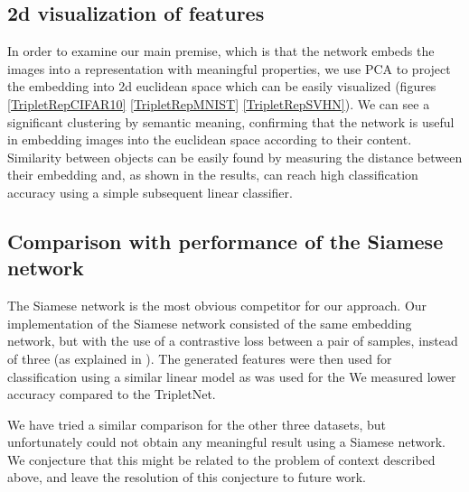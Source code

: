 \documentclass{article} %
\newcommand{\nir}[1]{{\color{red}{#1}}}
\begin{document}
\subsection{2d visualization of features}
In order to examine our main premise, which is that the network embeds the images into a representation with meaningful properties, we
use PCA to project the embedding into 2d euclidean space which can be easily visualized (figures \ref{TripletRepCIFAR10} \ref{TripletRepMNIST} \ref{TripletRepSVHN}).
We can see a significant clustering by semantic meaning, confirming that the network is useful in embedding
images into the euclidean space according to their content. 
 Similarity between objects can be easily found by  measuring the distance between their embedding and, as shown in the results, can reach high
classification accuracy using a simple subsequent linear classifier. 

\subsection{Comparison with performance of the Siamese network}
The Siamese network is the most obvious competitor for our approach.  Our implementation of the Siamese network consisted of the same embedding network, but with the use of a contrastive loss between a pair of samples, instead of three (as explained in  \cite{Chopra2005}).  The generated features were then used for classification using a similar linear model as was used for the We measured lower accuracy compared to the TripletNet. \nir{Fix the last sentence}

We have tried a similar comparison for the other three datasets, but unfortunately could not obtain any meaningful result using a Siamese network.
We conjecture that this might be related to the problem of context described above, and leave the resolution of this 
conjecture to future work.
\end{document}
